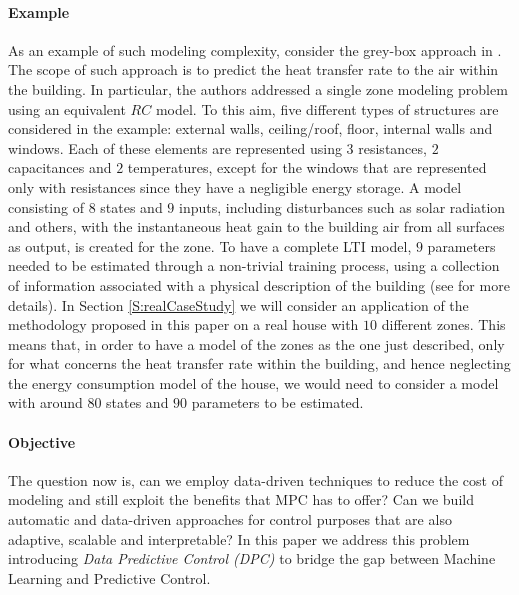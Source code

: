 
\paragraph{Example} As an example of such modeling complexity, consider the grey-box approach in \cite{Braun2002}. The scope of such approach is to predict the heat transfer rate to the air within the building. In particular, the authors addressed a single zone modeling problem using an equivalent $RC$ model. To this aim, five different types of structures are considered in the example: external walls, ceiling/roof, floor, internal walls and windows. Each of these elements are represented using $3$ resistances, $2$ capacitances and $2$ temperatures, except for the windows that are represented only with resistances since they have a negligible energy storage. A model consisting of $8$ states and $9$ inputs, including disturbances such as solar radiation and others, with the instantaneous heat gain to the building air from all surfaces as output, is created for the zone. To have a complete LTI model, $9$ parameters needed to be estimated through a non-trivial training process, using a collection of information associated with a physical description of the building (see \cite{Braun2002} for more details). In Section \ref{S:realCaseStudy} we will consider an application of the methodology proposed in this paper on a real house with $10$ different zones. This means that, in order to have a model of the zones as the one just described, only for what concerns the heat transfer rate within the building, and hence neglecting the energy consumption model of the house, we would need to consider a model with around $80$ states and $90$ parameters to be estimated.

	
\paragraph{Objective} The question now is, can we employ data-driven techniques to reduce the cost of modeling and still exploit the benefits that MPC has to offer? Can we build automatic and data-driven approaches for control purposes that are also adaptive, scalable and interpretable? In this paper we address this problem introducing \textit{Data Predictive Control (DPC)} to bridge the gap between Machine Learning and Predictive Control.

